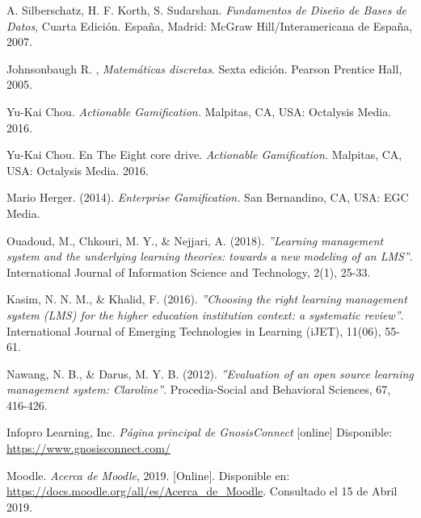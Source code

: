 \begin{thebibliography}{9}
        A. Silberschatz, H. F. Korth, S. Sudarshan. \textit{Fundamentos de Diseño de Bases de Datos}, Cuarta Edición. España, Madrid: McGraw Hill/Interamericana de España,  2007.
        
        Johnsonbaugh R. , \textit{Matemáticas discretas}. Sexta edición. Pearson Prentice Hall, 2005.
        
        Yu-Kai Chou.
        \textit{Actionable Gamification.}
        Malpitas, CA, USA: Octalysis Media. 2016. 
    
    
        Yu-Kai Chou.
        En The Eight core drive.
        \textit{Actionable Gamification.}
        Malpitas, CA, USA: Octalysis Media. 2016. 
    
        Mario Herger. (2014). 
        \textit{Enterprise Gamification.} 
        San Bernandino, CA, USA: EGC Media.
    
        
        Ouadoud, M., Chkouri, M. Y., \& Nejjari, A. (2018). {\it''Learning management system and the underlying learning theories: towards a new modeling of an LMS''}. International Journal of Information Science and Technology, 2(1), 25-33.
        
        Kasim, N. N. M., \& Khalid, F. (2016). {\it''Choosing the right learning management system (LMS) for the higher education institution context: a systematic review''}. International Journal of Emerging Technologies in Learning (iJET), 11(06), 55-61.
    
        Nawang, N. B., \& Darus, M. Y. B. (2012). {\it''Evaluation of an open source learning management system: Claroline''}. Procedia-Social and Behavioral Sciences, 67, 416-426.

    Infopro Learning, Inc. \textit{Página principal de GnosisConnect} [online] Disponible:
    \url{https://www.gnosisconnect.com/}
    
    
        Moodle. {\it Acerca de Moodle}, 2019. [Online]. Disponible en: \url{https://docs.moodle.org/all/es/Acerca_de_Moodle}. Consultado el 15 de Abril 2019.
    

\end{thebibliography}
